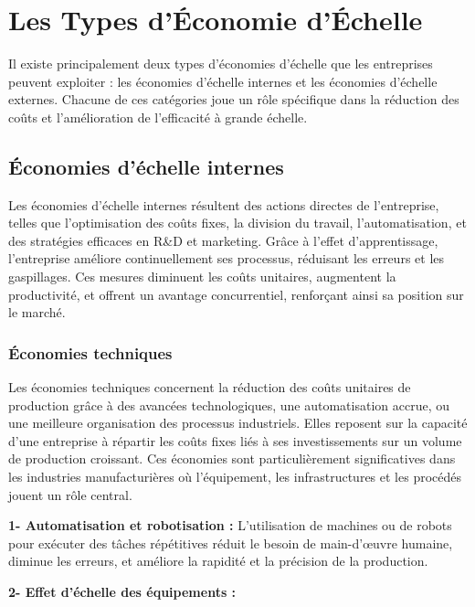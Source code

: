 
\chapter*{Les Types d'Économie d'Échelle}
\setcounter{chapter}{1}

Il existe principalement deux types d’économies d’échelle que les entreprises
peuvent exploiter : les économies d’échelle internes et les économies d’échelle
externes. Chacune de ces catégories joue un rôle spécifique dans la réduction
des coûts et l'amélioration de l'efficacité à grande échelle.

\section{Économies d’échelle internes}
\setcounter{section}{1}
Les économies d’échelle internes résultent des actions directes de
l’entreprise, telles que l’optimisation des coûts fixes, la division du
travail, l’automatisation, et des stratégies efficaces en R&D et marketing.
Grâce à l’effet d’apprentissage, l’entreprise améliore continuellement ses
processus, réduisant les erreurs et les gaspillages. Ces mesures diminuent les
coûts unitaires, augmentent la productivité, et offrent un avantage
concurrentiel, renforçant ainsi sa position sur le marché.
\subsection{ Économies techniques}
Les économies techniques concernent la réduction des coûts unitaires de
production grâce à des avancées technologiques, une automatisation accrue, ou
une meilleure organisation des processus industriels. Elles reposent sur la
capacité d’une entreprise à répartir les coûts fixes liés à ses investissements
sur un volume de production croissant. Ces économies sont particulièrement
significatives dans les industries manufacturières où l’équipement, les
infrastructures et les procédés jouent un rôle central.
\par
\textbf{1- Automatisation et robotisation :}
L’utilisation de machines ou de robots pour
exécuter des tâches répétitives réduit le besoin de main-d’œuvre humaine,
diminue les erreurs, et améliore la rapidité et la précision de la production.
\par
\textbf{2- Effet d’échelle des équipements :}

